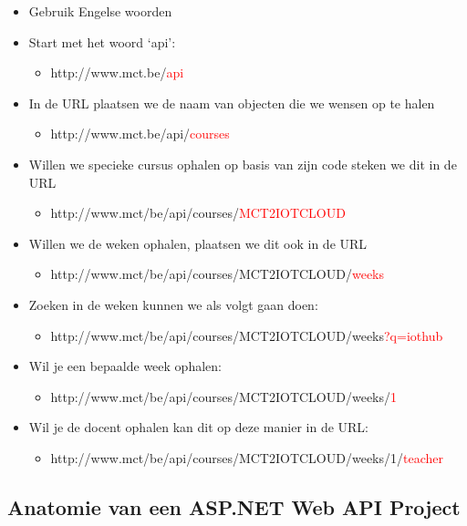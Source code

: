 \documentclass{article}
\begin{document}
\begin{itemize}
    \item Gebruik Engelse woorden
    \item Start met het woord `api':
    \begin{itemize}
        \item http://www.mct.be/\textcolor{red}{api}
    \end{itemize}
    \item In de URL plaatsen we de naam van objecten die we wensen op te halen
    \begin{itemize}
        \item http://www.mct.be/api/\textcolor{red}{courses}
    \end{itemize}
    \item Willen we specieke cursus ophalen op basis van zijn code steken we dit in de URL
    \begin{itemize}
        \item http://www.mct/be/api/courses/\textcolor{red}{MCT2IOTCLOUD}
    \end{itemize}
    \item Willen we de weken ophalen, plaatsen we dit ook in de URL
    \begin{itemize}
        \item http://www.mct/be/api/courses/MCT2IOTCLOUD/\textcolor{red}{weeks}
    \end{itemize}
    \item Zoeken in de weken kunnen we als volgt gaan doen:
    \begin{itemize}
        \item http://www.mct/be/api/courses/MCT2IOTCLOUD/weeks\textcolor{red}{?q=iothub}
    \end{itemize}
    \item Wil je een bepaalde week ophalen:
    \begin{itemize}
        \item http://www.mct/be/api/courses/MCT2IOTCLOUD/weeks/\textcolor{red}{1}
    \end{itemize}
    \item Wil je de docent ophalen kan dit op deze manier in de URL:
    \begin{itemize}
        \item http://www.mct/be/api/courses/MCT2IOTCLOUD/weeks/1/\textcolor{red}{teacher}
    \end{itemize}
\end{itemize}

\subsection{Anatomie van een ASP.NET Web API Project}
\end{document}
